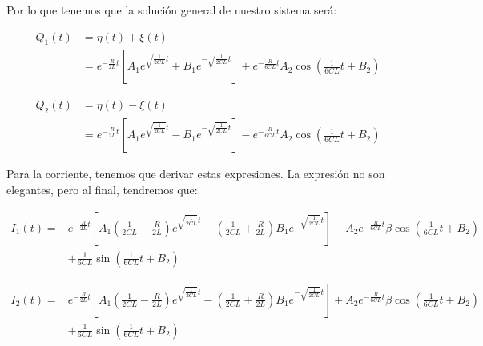 \documentclass[a4paper,12pt]{article}
\begin{document}
Por lo que tenemos que la solución general de nuestro sistema será:

\begin{equation}
  \begin{aligned}
     Q_1(t)& = \eta(t) + \xi(t) \\&= e^{-\frac{R}{2L} t}  \left[A_1 e^{\sqrt{\frac{1}{2CL}} t} + B_1 e^{-\sqrt{\frac{1}{2CL}} t}\right] + e^{-\frac{R}{6CL} t}A_2\cos{\left(\frac{1}{6CL} t + B_2\right)}  
  \end{aligned}
\end{equation}

\begin{equation}
\begin{aligned}
    Q_2(t) &= \eta(t) - \xi(t) \\&= e^{-\frac{R}{2L} t}  \left[A_1 e^{\sqrt{\frac{1}{2CL}} t} - B_1 e^{-\sqrt{\frac{1}{2CL}} t}\right] -e^{-\frac{R}{6CL} t} A_2\cos{\left(\frac{1}{6CL} t + B_2\right)}
\end{aligned}
\end{equation}

Para la corriente, tenemos que derivar estas expresiones. La expresión no son elegantes, pero al final, tendremos que:

\begin{equation}
\begin{aligned}
  I_1(t) =& e^{-\frac{R}{2L} t}  \left[A_1\left(\frac{1}{2CL}- \frac{R}{2L}\right) e^{\sqrt{\frac{1}{2CL}} t} - \left(\frac{1}{2CL}+ \frac{R}{2L}\right)B_1 e^{-\sqrt{\frac{1}{2CL}} t}\right] - A_2 e^{-\frac{R}{6CL} t} \beta\cos{\left(\frac{1}{6CL} t + B_2\right)}\\& + \frac{1}{6CL}\sin{\left(\frac{1}{6CL} t + B_2\right)}
\end{aligned}
\end{equation}

\begin{equation}
\begin{aligned}
  I_2(t) =& e^{-\frac{R}{2L} t}  \left[A_1\left(\frac{1}{2CL}- \frac{R}{2L}\right) e^{\sqrt{\frac{1}{2CL}} t} - \left(\frac{1}{2CL}+ \frac{R}{2L}\right)B_1 e^{-\sqrt{\frac{1}{2CL}} t}\right] + A_2 e^{-\frac{R}{6CL} t} \beta\cos{\left(\frac{1}{6CL} t + B_2\right)}\\& + \frac{1}{6CL}\sin{\left(\frac{1}{6CL} t + B_2\right)}
\end{aligned}
\end{equation}

\pagebreak
\end{document}
